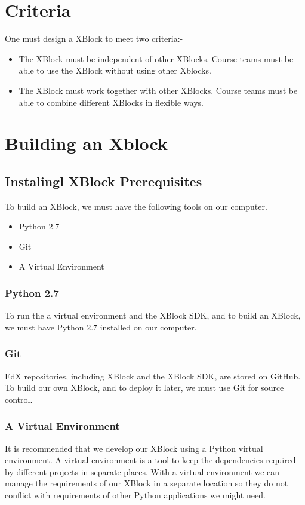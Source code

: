 \section{Criteria}
One must design a XBlock to meet two criteria:-
\begin{itemize}
\item The XBlock must be independent of other XBlocks. Course teams must be able to use the
XBlock without using other Xblocks.
\item The XBlock must work together with other XBlocks. Course teams must be able to combine
different XBlocks in flexible ways.
\end{itemize}

\section{Building an Xblock}
\subsection{Instalingl XBlock Prerequisites}
To build an XBlock, we must have the following tools on our computer.
\begin{itemize}
\item Python 2.7
\item Git
\item A Virtual Environment
\end{itemize}
\subsubsection{Python 2.7}
To run the a virtual environment and the XBlock SDK, and to build an XBlock, we must
have Python 2.7 installed on our computer.
\subsubsection{Git}
EdX repositories, including XBlock and the XBlock SDK, are stored on GitHub. To build
our own XBlock, and to deploy it later, we must use Git for source control.
\subsubsection{A Virtual Environment}
It is recommended that we develop our XBlock using a Python virtual environment. A
virtual environment is a tool to keep the dependencies required by different projects in
separate places. With a virtual environment we can manage the requirements of our XBlock
in a separate location so they do not conflict with requirements of other Python applications
we might need.

